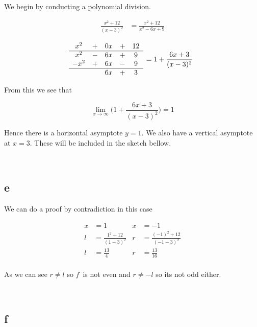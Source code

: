 \documentclass{article}
\newcommand{\blankpage}{
    \newpage
    \
    \newpage
}
\begin{document}
We begin by conducting a polynomial division.

\begin{align*}
    \frac{x^2 + 12}{(x-3)^2} &= \frac{x^2 + 12}{x^2 - 6 x + 9}
\end{align*}

$$ \begin{matrix}
    x^2  &+& 0 x &+& 12 \\
    \hline
    x^2  &-& 6 x &+& 9 \\
    -x^2 &+& 6 x &-& 9 \\
    \hline
         & & 6 x &+& 3 \\
\end{matrix} ~~ = 1 + \frac{6x + 3}{(x-3)^2}$$

From this we see that

$$ \lim_{x \to \infty} \Big(1+\frac{6x + 3}{(x-3)^2}\Big) = 1 $$

Hence there is a horizontal asymptote $y = 1$. We also have a vertical asymptote at $x = 3$. These will be included in the sketch bellow.

\blankpage
\subsection{e}

We can do a proof by contradiction in this case

\begin{align*}
    x &= 1 & x &= -1 \\
    \hline
    l &= \frac{1^2 + 12}{(1-3)^2} &
    r &= \frac{(-1)^2 + 12}{(-1-3)^2} \\
    l &= \frac{13}{4} &
    r &= \frac{13}{16} \\
\end{align*}

As we can see $r \ne l$ so $f$ is not even and $r \ne -l$ so its not odd either.





\blankpage
\subsection{f}
\end{document}
